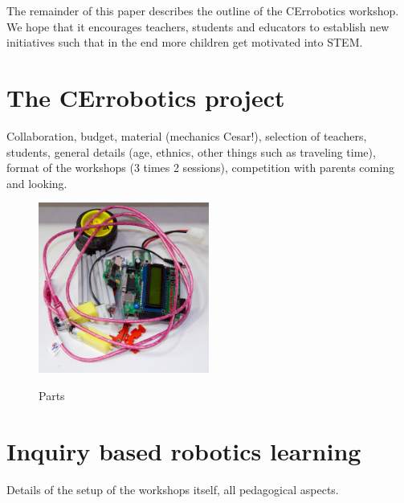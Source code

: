 \documentclass[a4paper]{llncs}
\begin{document}
The remainder of this paper describes the outline of the CErrobotics workshop. We hope that it encourages teachers, students and educators to establish new initiatives such that in the end more children get motivated into STEM.

\section{The CErrobotics project}
Collaboration, budget, material (mechanics Cesar!), selection of teachers, students, general details (age, ethnics, other things such as traveling time), format of the workshops (3 times 2 sessions), competition with parents coming and looking.
\begin{figure}[htp]
\begin{center}
\includegraphics[width=0.5\textwidth]{img/robot_parts.jpg}\label{fig:parts}
\caption[]{Parts}
\end{center}
\end{figure}

\section{Inquiry based robotics learning}
Details of the setup of the workshops itself, all pedagogical aspects.
\end{document}
